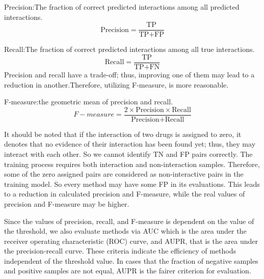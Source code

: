 \documentclass{bmcart}
\begin{document}
Precision:The fraction of correct predicted interactions among all predicted interactions.
$$ \mbox{Precision} =  \frac{\mbox{TP}}{\mbox{TP} + \mbox{FP}} $$

Recall:The fraction of correct predicted interactions among all true interactions.
$$ \mbox{Recall} =  \frac{ \mbox{TP}}{\mbox{TP} + \mbox{FN}} $$
Precision and recall have a trade-off; thus, improving one of them may lead to a reduction in another.Therefore, utilizing F-measure, is more reasonable.

F-measure:the geometric mean of precision and recall.
$$ F-measure = \frac{ 2\times \mbox{Precision} \times \mbox{Recall}}{\mbox{Precision} + \mbox{Recall}} $$

It should be noted that if the interaction of two drugs is assigned to zero, it denotes that no evidence of their interaction has been found yet; thus, they may interact with each other. So we cannot identify TN and FP pairs correctly. The training process requires both interaction and non-interaction samples. Therefore, some of the zero assigned pairs are considered as non-interactive pairs in the training model. So every method may have some FP in its evaluations. This leads to a reduction in calculated precision and F-measure, while the real values of precision and F-measure may be higher.

Since the values of precision, recall, and F-measure is dependent on the value of the threshold, we also evaluate methods via AUC which is the area under the receiver operating characteristic (ROC) curve, and AUPR, that is the area under the precision-recall curve. These criteria indicate the efficiency of methods independent of the threshold value. In cases that the fraction of negative samples and positive samples are not equal, AUPR is the fairer criterion for evaluation.



\end{document}
